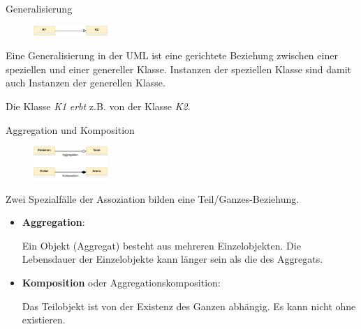 \begin{defi}{Generalisierung}
    \begin{figure}
        \centering
        \includegraphics[width=0.25\textwidth]{includes/figures/defi_diagrams_class_vererbung.pdf}
    \end{figure}
    Eine Generalisierung in der UML ist eine gerichtete Beziehung zwischen einer speziellen und einer genereller Klasse.
    Instanzen der speziellen Klasse sind damit auch Instanzen der generellen Klasse.

    Die Klasse \emph{K1} \emph{erbt} z.B. von der Klasse \emph{K2}.
\end{defi}

\begin{defi}{Aggregation und Komposition}
    \begin{figure}
        \centering
        \includegraphics[width=0.25\textwidth]{includes/figures/defi_diagrams_class_aggregation_composition.pdf}
    \end{figure}
    Zwei Spezialfälle der Assoziation bilden eine Teil/Ganzes-Beziehung.

    \begin{itemize}
        \item \textbf{Aggregation}:

              Ein Objekt (Aggregat) besteht aus mehreren Einzelobjekten.
              Die Lebensdauer der Einzelobjekte kann länger sein als die des Aggregats.
        \item \textbf{Komposition} oder Aggregationskomposition:

              Das Teilobjekt ist von der Existenz des Ganzen abhängig.
              Es kann nicht ohne existieren.
    \end{itemize}
\end{defi}

